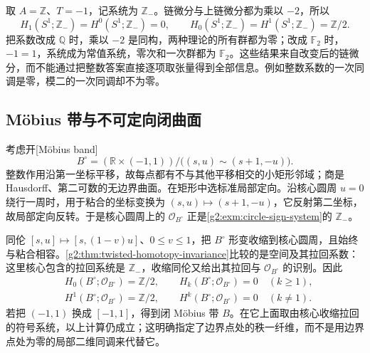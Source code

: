 \begin{example}\label{g2:exm:circle-sign-system}
	取 \(A=\mathbb Z\)、\(T=-1\)，记系统为 \(\mathbb Z_{-}\)。链微分与上链微分都为乘以 \( -2\)，所以
	\[
		H_1(S^1;\mathbb Z_{-})=H^0(S^1;\mathbb Z_{-})=0,
		\qquad H_0(S^1;\mathbb Z_{-})=H^1(S^1;\mathbb Z_{-})=\mathbb Z/2.
	\]
	把系数改成 \(\mathbb Q\) 时，乘以 \( -2\) 是同构，两种理论的所有群都为零；改成 \(\mathbb F_2\) 时，\( -1=1\)，系统成为常值系统，零次和一次群都为 \(\mathbb F_2\)。这些结果来自改变后的链微分，而不能通过把整数答案直接逐项取张量得到全部信息。例如整数系数的一次同调是零，模二的一次同调却不为零。
\end{example}

\subsection{Möbius 带与不可定向闭曲面}
\label{g2:subsec:0503:03}
考虑开[Möbius band]
\begin{equation}\label{g2:eq:open-moebius-model}
	B^{\circ}=(\mathbb R\times(-1,1))/\bigl((s,u)\sim(s+1,-u)\bigr).
\end{equation}
整数作用沿第一坐标平移，故每点都有不与其他平移相交的小矩形邻域；商是 Hausdorff、第二可数的无边界曲面。在矩形中选标准局部定向。沿核心圆周 \(u=0\) 绕行一周时，用于粘合的坐标变换为 \((s,u)\mapsto(s+1,-u)\)，它反射第二坐标，故局部定向反转。于是核心圆周上的 \(\mathcal O_{B^{\circ}}\) 正是\cref{g2:exm:circle-sign-system}的 \(\mathbb Z_{-}\)。

\ProseParagraphBreak

同伦 \([s,u]\mapsto[s,(1-v)u]\)、\(0\leq v\leq1\)，把 \(B^{\circ}\) 形变收缩到核心圆周，且始终与粘合相容。\cref{g2:thm:twisted-homotopy-invariance}比较的是空间及其拉回系数：这里核心包含的拉回系统是 \(\mathbb Z_{-}\)，收缩同伦又给出其拉回与 \(\mathcal O_{B^{\circ}}\) 的识别。因此
\begin{equation}\label{g2:eq:moebius-orientation-groups}
	\begin{aligned}
		&H_0(B^{\circ};\mathcal O_{B^{\circ}})=\mathbb Z/2,\qquad H_k(B^{\circ};\mathcal O_{B^{\circ}})=0\quad(k\geq1),\\
		&H^1(B^{\circ};\mathcal O_{B^{\circ}})=\mathbb Z/2,\qquad H^k(B^{\circ};\mathcal O_{B^{\circ}})=0\quad(k\ne1).
	\end{aligned}
\end{equation}
若把 \((-1,1)\) 换成 \([-1,1]\)，得到闭 Möbius 带 \(B\)。在它上面取由核心收缩拉回的符号系统，以上计算仍成立；这明确指定了边界点处的秩一纤维，而不是用边界点处为零的局部二维同调来代替它。

